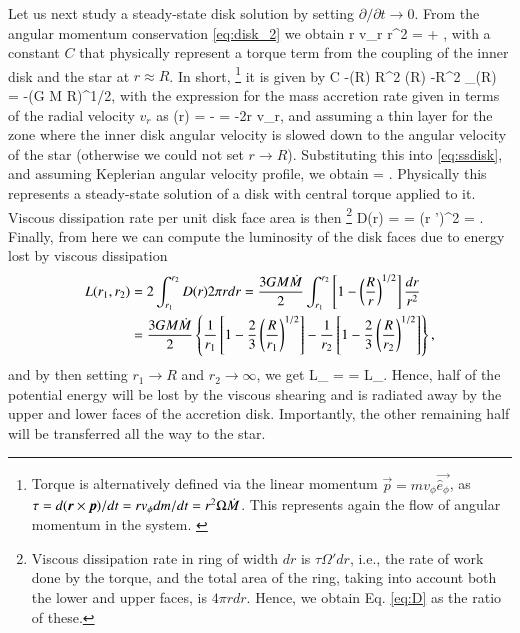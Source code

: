 Let us next study a steady-state disk solution by setting $\partial/\partial t \rightarrow 0$.
From the angular momentum conservation \eqref{eq:disk_2} we obtain
\be\label{eq:ssdisk}
r \Sigma v_{r} r^2 \Omega = \frac{\tau}{2\pi} + ,
\ee
with a constant $C$ that physically represent a torque term from the coupling of the inner disk and the star at $r \approx R$.
In short,%
\footnote{Torque is alternatively defined via the linear momentum $\vec{p} = m v_{\phi} \vec{\hat{e}_{\phi}}$, as $\tau = d(\boldsymbol{r} \times \boldsymbol{p})/dt = r v_{\phi} dm/dt = r^2 \Omega \dot{M}$. 
This represents again the flow of angular momentum in the system.
\cite[see, e.g.,][for more thorough discussion]{FKR02}
}
it is given by
\be\label{eq:visc_torque}
C \approx -\Mdot(R) R^2 \Omega(R) \approx -\Mdot R^2 \Omega_{}(R) = -\Mdot (G M R)^{1/2},
\ee
with the expression for the mass accretion rate given in terms of the radial velocity $v_r$ as
\be
\Mdot(r) = - = -2\pi r \Sigma v_r,
\ee
and assuming a thin layer for the zone where the inner disk angular velocity is slowed down to the angular velocity of the star (otherwise we could not set $r \rightarrow R$).
Substituting this into \eqref{eq:ssdisk}, and assuming Keplerian angular velocity profile, we obtain
\be
\nu \Sigma = \frac{\Mdot}{3\pi} .
\ee
Physically this represents a steady-state solution of a disk with central torque applied to it.
Viscous dissipation rate per unit disk face area is then%
\footnote{Viscous dissipation rate in ring of width $dr$ is $\tau \Omega' dr$, i.e., the rate of work done by the torque, and the total area of the ring, taking into account both the lower and upper faces, is $4\pi r dr$. Hence, we obtain Eq. \eqref{eq:D} as the ratio of these.
}
\be\label{eq:D}
D(r) =  =  \nu \Sigma (r \Omega')^2 =  .
\ee
Finally, from here we can compute the luminosity of the disk faces due to energy lost by viscous dissipation
\begin{align}\begin{split}
    L(r_1, r_2)  &= 2 \int_{r_1}^{r_2} D(r) 2\pi r dr = \frac{3 G M \dot{M}}{2} \int_{r_1}^{r_2} \left[ 1 - \left( \frac{R}{r} \right)^{1/2} \right] \frac{dr}{r^2} \\
 & = \frac{3 G M \dot{M}}{2} \left\{ \frac{1}{r_1} \left[ 1 - \frac{2}{3}\left( \frac{R}{r_1} \right)^{1/2} \right] -  \frac{1}{r_2} \left[ 1 - \frac{2}{3}\left( \frac{R}{r_2} \right)^{1/2} \right] \right\}, 
\end{split}\end{align}
and by then setting $r_1 \rightarrow R$ and $r_2 \rightarrow \infty$, we get
\be
L_{} =  =  L_{}.
\ee
Hence, half of the potential energy will be lost by the viscous shearing and is radiated away by the upper and lower faces of the accretion disk.
Importantly, the other remaining half will be transferred all the way to the star.

